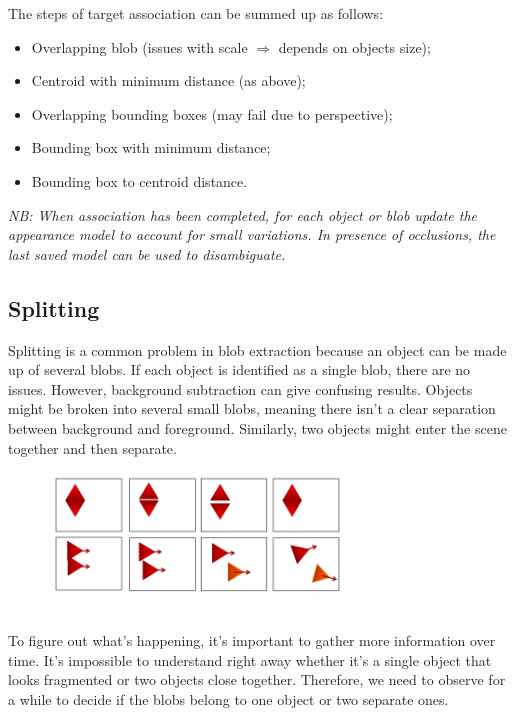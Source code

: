The steps of target association can be summed up as follows:
\begin{itemize}
\item Overlapping blob (issues with scale $\Rightarrow$ depends on objects size);
\item Centroid with minimum distance (as above);
\item Overlapping bounding boxes (may fail due to perspective);
\item Bounding box with minimum distance;
\item Bounding box to centroid distance.
\end{itemize}

\textit{NB: When association has been completed, for each object or blob update the appearance model to account for small variations. In presence of occlusions, the last saved model can be used to disambiguate.}

\subsection{Splitting}
Splitting is a common problem in blob extraction because an object can be made up of several blobs. 
If each object is identified as a single blob, there are no issues. 
However, background subtraction can give confusing results. 
Objects might be broken into several small blobs, meaning there isn't a clear separation between background and foreground. 
Similarly, two objects might enter the scene together and then separate.
\begin{figure}[h]
    \centering
    \includegraphics[width=0.7\textwidth]{Figures/Splitting.png}
\end{figure}\\
To figure out what's happening, it's important to gather more information over time. 
It's impossible to understand right away whether it's a single object that looks fragmented or two objects close together. 
Therefore, we need to observe for a while to decide if the blobs belong to one object or two separate ones.
